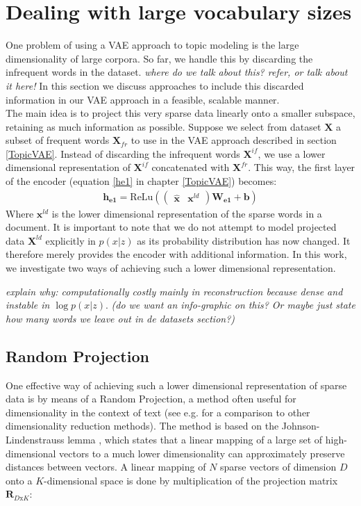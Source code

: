\documentclass{report}
\begin{document}
\section{Dealing with large vocabulary sizes}
One problem of using a VAE approach to topic modeling is the large dimensionality of large corpora. So far, we handle this by discarding the infrequent words in the dataset. \textit{where do we talk about this? refer, or talk about it here!}  In this section we discuss approaches to include this discarded information in our VAE approach in a feasible, scalable manner.\\
The main idea is to project this very sparse data linearly onto a smaller subspace, retaining as much information as possible. Suppose we select from dataset $\mathbf{X}$ a subset of frequent words $\mathbf{X}_{fr}$ to use in the VAE approach described in section \ref{TopicVAE}. Instead of discarding the infrequent words $\mathbf{X}^{if}$, we use a lower dimensional representation of $\mathbf{X}^{if}$ concatenated with $\mathbf{X}^{fr}$. This way, the first layer of the encoder (equation \ref{he1} in chapter \ref{TopicVAE}) becomes:
\begin{align}
\mathbf{h_{e1}} = \text{ReLu}(\left(\begin{matrix}
\mathbf{\hat{x}} &
\mathbf{x}^{ld}
\end{matrix}\right)\mathbf{W_{e1}} + \mathbf{b}) \label{he1_RP}
\end{align}
Where $\mathbf{x}^{ld}$ is the lower dimensional representation of the sparse words in a document.
It is important to note that we do not attempt to model projected data $\mathbf{X}^{ld}$ explicitly in $p(x|z)$  as its probability distribution has now changed.  It therefore merely provides the encoder with additional information. In this work, we investigate two ways of achieving such a lower dimensional representation. 


\textit{explain why: computationally costly mainly in reconstruction because dense and instable in $\log p(x|z)$}.
\textit{(do we want an info-graphic on this? Or maybe just state how many words we leave out in de datasets section?)}

\subsection{Random Projection}\label{RP}
One effective way of achieving such a lower dimensional representation of sparse data is by means of a Random Projection, a method often useful for dimensionality in the context of text (see e.g. \cite{bingham2001random} for a comparison to other dimensionality reduction methods). The method is based on the Johnson-Lindenstrauss lemma \cite{frankl1988johnson}, which states that a linear mapping of a large set of high-dimensional vectors to a much lower dimensionality can approximately preserve distances between vectors. A linear mapping of $N$ sparse vectors of dimension $D$ onto a $K$-dimensional space is done by multiplication of the projection matrix $\mathbf{R}_{D\text{x}K}$:
\end{document}
